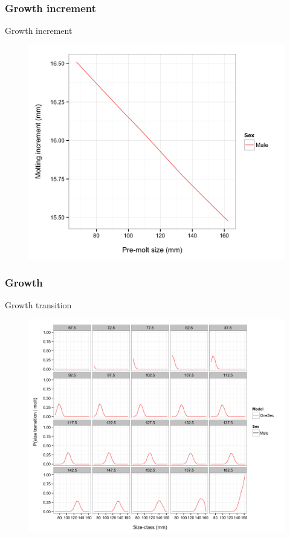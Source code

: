 \documentclass{beamer}
\begin{document}

\begin{frame}
\frametitle{Growth increment}
Growth increment
\begin{figure}[!htbp]
  \centering
  \includegraphics[width=0.75\linewidth]{../../examples/bbrkc/OneSex/figure/gi.png}
\end{figure}
\end{frame}


\begin{frame}
\frametitle{Growth}
Growth transition
\begin{figure}[!htbp]
  \centering
  \includegraphics[width=0.75\linewidth]{../../examples/bbrkc/OneSex/figure/growth_transition.png}
\end{figure}
\end{frame}
\end{document}
